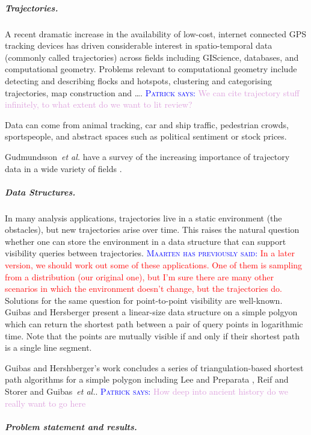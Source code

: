 \documentclass[a4paper, UKenglish]{paper}
\newcommand{\myremark}[4]{\textcolor{blue}{\textsc{#1 #2:}} \textcolor{#4}{\textsf{#3}}}
\newcommand{\patrick}[2][says]{\myremark{Patrick}{#1}{#2}{Plum}}
\newcommand{\maarten}[2][says]{\myremark{Maarten}{#1}{#2}{Red}}
\newcommand{\etal}{\textit{et al.}\xspace}
\begin{document}
\subparagraph{Trajectories.}
A recent dramatic increase in the availability of low-cost, internet connected GPS tracking devices has driven considerable interest in spatio-temporal data (commonly called trajectories) across fields including GIScience, databases, and computational geometry. Problems relevant to computational geometry include detecting and describing flocks \cite{AnderssonGLW07, BenkertGHW08, LaubeKI04} and hotspots, clustering and categorising trajectories, map construction and \ldots.
\patrick{We can cite trajectory stuff infinitely, to what extent do we want to lit review?}

Data can come from animal tracking, car and ship traffic, pedestrian crowds, sportspeople, and abstract spaces such as political sentiment or stock prices.

Gudmundsson~\etal have a survey of the increasing importance of trajectory data in a wide variety of fields \cite{GudmundssonLW17}.

\subparagraph{Data Structures.}
In many analysis applications, trajectories live in a static environment (the obstacles), but new trajectories arise over time. This raises the natural question whether one can store the environment in a data structure that can support visibility queries between trajectories.
\maarten[has previously said]{In a later version, we should work out some of these applications. One of them is sampling from a distribution (our original one), but I'm sure there are many other scenarios in which the environment doesn't change, but the trajectories do.}
Solutions for the same question for point-to-point visibility are well-known.
Guibas and Hersberger \cite{guibas1989optimal} present a linear-size data structure on a simple polgyon which can return the shortest path between a pair of query points in logarithmic time. Note that the points are mutually visible if and only if their shortest path is a single line segment.

Guibas and Hershberger's work concludes a series of triangulation-based shortest path algorithms for a simple polygon including Lee and Preparata \cite{LeeP84}, Reif and Storer \cite{ReifS85} and Guibas~\etal \cite{GuibasHLST87}. \patrick{How deep into ancient history do we really want to go here}

\subparagraph{Problem statement and results.}
\end{document}
